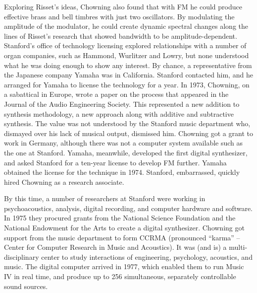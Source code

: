 Exploring Risset's ideas, Chowning also found that with FM he could produce effective brass and bell timbres with just two oscillators. By modulating the amplitude of the modulator, he could create dynamic spectral changes along the lines of Risset's research that showed bandwidth to be amplitude-dependent. Stanford's office of technology licensing explored relationships with a number of organ companies, such as Hammond, Wurlitzer and Lowry, but none understood what he was doing enough to show any interest. By chance, a representative from the Japanese company Yamaha was in California. Stanford contacted him, and he arranged for Yamaha to license the technology for a year. In 1973, Chowning, on a sabattical in Europe, wrote a paper on the process that appeared in the Journal of the Audio Engineering Society. This represented a new addition to synthesis methodology, a new approach along with additive and subtractive synthesis. The value was not understood by the Stanford music department who, dismayed over his lack of musical output, dismissed him. Chowning got a grant to work in Germany, although there was not a computer system available such as the one at Stanford. Yamaha, meanwhile, developed the first digital synthesizer, and asked Stanford for a ten-year license to develop FM further. Yamaha obtained the license for the technique in 1974. Stanford, embarrassed, quickly hired Chowning as a research associate.

By this time, a number of researchers at Stanford were working in psychoacoustics, analysis, digital recording, and computer hardware and software. In 1975 they procured grants from the National Science Foundation and the National Endowment for the Arts to create a digital synthesizer. Chowning got support from the music department to form CCRMA (pronounced ``karma'' -- Center for Computer Research in Music and Acoustics). It was (and is) a multi-disciplinary center to study interactions of engineering, psychology, acoustics, and music. The digital computer arrived in 1977, which enabled them to run Music IV in real time, and produce up to 256 simultaneous, separately controllable sound sources.

